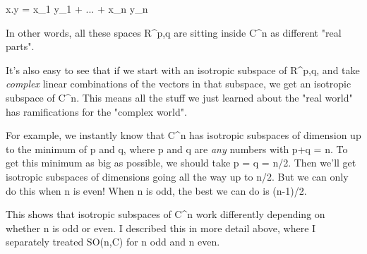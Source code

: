 x.y = x_{1} y_{1} + ... + x_{n} y_{n}

In other words, all these spaces R^{p,q} are sitting inside 
C^{n} as different "real parts". 


It's also easy to see that if we start with an isotropic subspace of
R^{p,q}, and take \emph{complex} linear combinations of the
vectors in that subspace, we get an isotropic subspace of C^{n}.
This means all the stuff we just learned about the "real world" has
ramifications for the "complex world".


For example, we instantly know that C^{n} has isotropic subspaces of 
dimension up to the minimum of p and q, where p and q are \emph{any}
numbers with p+q = n.  To get this minimum as big as possible, we should
take p = q = n/2.  Then we'll get isotropic subspaces of dimensions
going all the way up to n/2.  But we can only do this when n is even!  
When n is odd, the best we can do is (n-1)/2.


This shows that isotropic subspaces of C^{n} work differently depending
on whether n is odd or even.   I described this in more detail above,
where I separately treated SO(n,C) for n odd and n even.

